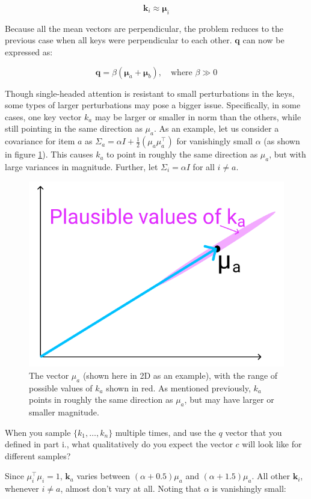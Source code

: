 \begin{parts}
\begin{subparts}
\begin{answer}
        $$\mathbf{k}_i\approx\mathbf{\mu}_i$$
        
        Because all the mean vectors are perpendicular, the problem reduces to the previous case when all keys were perpendicular to each other. $\mathbf{q}$ can now be expressed as:
        
        $$\mathbf{q}=\beta(\mathbf{\mu}_a + \mathbf{\mu}_b),\quad\text{where } \beta \gg 0$$
\end{answer}

\subpart[3] Though single-headed attention is resistant to small perturbations in the keys, some types of larger perturbations may pose a bigger issue. Specifically, in some cases, one key vector $k_a$ may be larger or smaller in norm than the others, while still pointing in the same direction as $\mu_a$. As an example, let us consider a covariance for item $a$ as $\Sigma_a = \alpha I + \frac{1}{2}(\mu_a\mu_a^\top)$ for vanishingly small $\alpha$ (as shown in figure \ref{ka_plausible}). This causes $k_a$ to point in roughly the same direction as $\mu_a$, but with large variances in magnitude. Further, let $\Sigma_i = \alpha I$ for all $i \neq a$.
\begin{figure}[h]
\centering
\captionsetup{justification=centering,margin=2cm}
\includegraphics[width=0.35\linewidth]{images/ka_plausible.png}
\caption{The vector $\mu_a$ (shown here in 2D as an example), with the range of possible values of $k_a$ shown in red. As mentioned previously, $k_a$ points in roughly the same direction as $\mu_a$, but may have larger or smaller magnitude.}
\label{ka_plausible}
\end{figure}

When you sample $\{k_1,\dots,k_n\}$ multiple times, and use the $q$ vector that you defined in part i., what qualitatively do you expect the vector $c$ will look like for different samples?

\begin{answer}
    Since $\mu_i^{\top}\mu_i=1$, $\mathbf{k}_a$ varies between $(\alpha + 0.5)\mu_a$ and $(\alpha + 1.5)\mu_a$. All other $\mathbf{k}_i$, whenever $i\ne a$, almost don't vary at all. Noting that $\alpha$ is vanishingly small:
    

\end{answer}
\end{subparts}
\end{parts}
